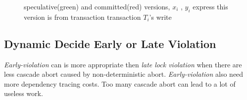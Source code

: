 \documentclass[conference]{IEEEtran}
\begin{document}
\begin{figure}[htbp]
{  }
  \caption{speculative(green) and committed(red) versions, 
  ${x_i}$ , ${y_i}$ express this version is from transaction transaction ${T_i}$'s write
}
\label{fig:versions_example}
\end{figure}

\subsection {Dynamic Decide Early or Late Violation}
\emph{Early-violation} can is more appropriate then \emph{late lock violation} when there are less cascade abort caused by non-deterministic abort.
\emph{Early-violation} also need more dependency tracing costs.
Too many cascade abort can lead to a lot of useless work.
\end{document}
